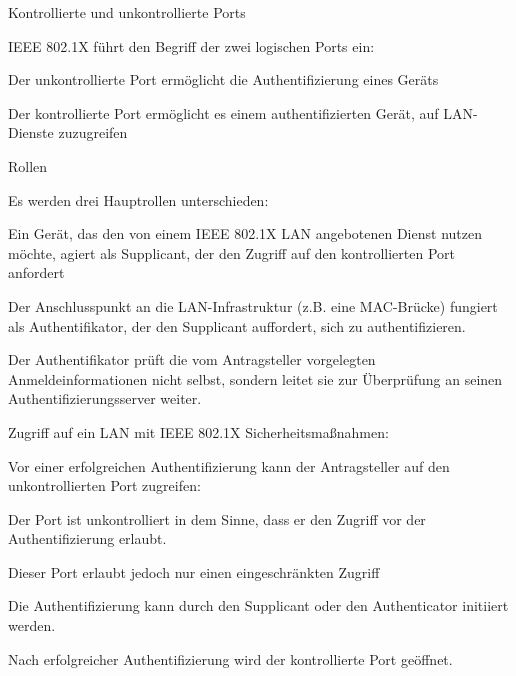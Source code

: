 \documentclass[a4paper]{article}
\begin{document}
\begin{multicols}{3}
      Kontrollierte und unkontrollierte Ports
      \begin{itemize*}
            \item IEEE 802.1X führt den Begriff der zwei logischen Ports ein:
            \item Der unkontrollierte Port ermöglicht die Authentifizierung eines Geräts
            \item Der kontrollierte Port ermöglicht es einem authentifizierten Gerät, auf LAN-Dienste zuzugreifen
      \end{itemize*}

      Rollen
      \begin{itemize*}
            \item Es werden drei Hauptrollen unterschieden:
            \begin{itemize*}
                  \item Ein Gerät, das den von einem IEEE 802.1X LAN angebotenen Dienst nutzen möchte, agiert als Supplicant, der den Zugriff auf den kontrollierten Port anfordert
                  \item Der Anschlusspunkt an die LAN-Infrastruktur (z.B. eine MAC-Brücke) fungiert als Authentifikator, der den Supplicant auffordert, sich zu authentifizieren.
                  \item Der Authentifikator prüft die vom Antragsteller vorgelegten Anmeldeinformationen nicht selbst, sondern leitet sie zur Überprüfung an seinen Authentifizierungsserver weiter.
            \end{itemize*}
            \item Zugriff auf ein LAN mit IEEE 802.1X Sicherheitsmaßnahmen:
            \begin{itemize*}
                  \item Vor einer erfolgreichen Authentifizierung kann der Antragsteller auf den unkontrollierten Port zugreifen:
                  \item Der Port ist unkontrolliert in dem Sinne, dass er den Zugriff vor der Authentifizierung erlaubt.
                  \item Dieser Port erlaubt jedoch nur einen eingeschränkten Zugriff
                  \item Die Authentifizierung kann durch den Supplicant oder den Authenticator initiiert werden.
                  \item Nach erfolgreicher Authentifizierung wird der kontrollierte Port geöffnet.
            \end{itemize*}
      \end{itemize*}


\end{multicols}
\end{document}
